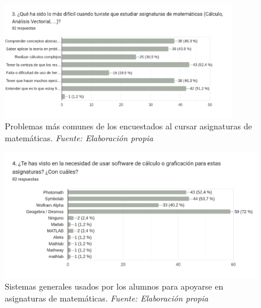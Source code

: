 \begin{figure}[H]
	\centering
	\includegraphics[width=0.9\textwidth]{img/appendixA/3_dificil_en_mates.png}
	\caption[Problemas más comunes de los encuestados al cursar asignaturas de matemáticas.]{Problemas más comunes de los encuestados al cursar asignaturas de matemáticas. \textit{Fuente: Elaboración propia}}
	\label{fig:app1_dificultad_en_mates}  %
\end{figure}

\begin{figure}[H]
	\centering
	\includegraphics[width=1\textwidth]{img/appendixA/4_software_para_mates.png}
	
	\caption[Sistemas generales usados por los alumnos para apoyarse en asignaturas de matemáticas.]{Sistemas generales usados por los alumnos para apoyarse en asignaturas de matemáticas. \textit{Fuente: Elaboración propia}}
	\label{fig:app1_caracteristicas_para_app_mates}  %
	
\end{figure}


